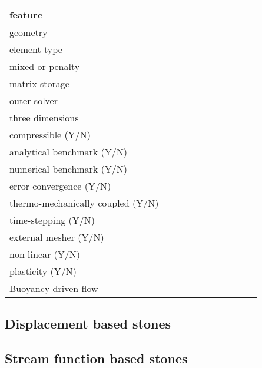\begin{landscape}
\noindent 
{\scriptsize
\begin{tabular}{|l|p{1.5cm}|p{1.5cm}|p{1.5cm}|p{1.5cm}|p{1.5cm}|p{1.5cm}|p{1.5cm}|p{1.5cm}|p{1.5cm}|p{1.5cm}|} 
\hline
feature & &&&&&&&&& \\ 
\hline
geometry &  &&&&&&&&& \\
element type &&&&&&&&&\\ 
mixed or penalty  & &&&&&&&&& \\
matrix storage & & &&&&&&&& \\
outer solver &  &&&&&&&&& \\
\hline
three dimensions &  &&&&&&&&& \\
compressible (Y/N) &&&&&&&&&& \\
analytical benchmark (Y/N) &&&&&&&&&& \\
numerical benchmark (Y/N) &  &&&&&&&&& \\
error convergence (Y/N) & &&&&&&&&& \\
thermo-mechanically coupled (Y/N) &&&&&&&&&& \\
time-stepping (Y/N) &&&&&&&&&& \\
external mesher (Y/N) &&&&&&&&&& \\
non-linear (Y/N) &&&&&&&&&& \\
plasticity (Y/N) & &  &&&&&&&&\\ 
Buoyancy driven flow & &  &&&&&&&\\
\hline
\end{tabular}
}





\subsection{Displacement based stones}

\subsection{Stream function based stones}


\end{landscape}
